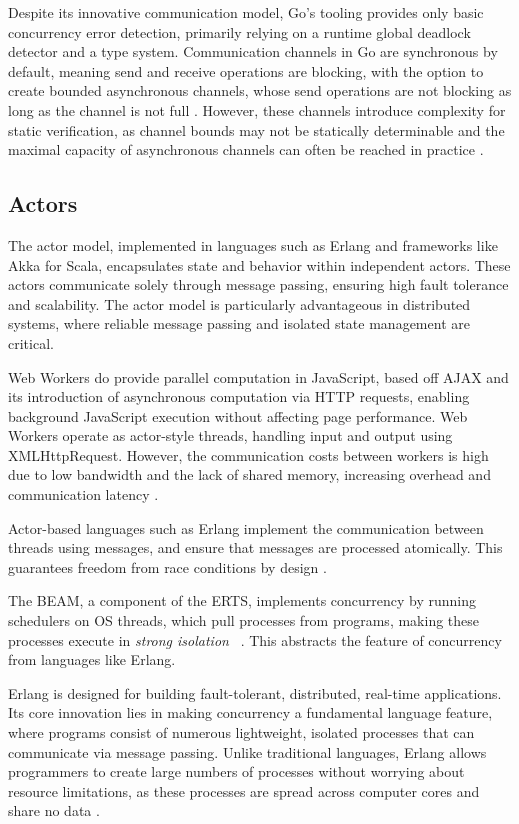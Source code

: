 \documentclass[]{final}
\begin{document}
Despite its innovative communication model, Go's tooling provides only basic
concurrency error detection, primarily relying on a runtime global deadlock
detector and a type system. Communication channels
in Go are synchronous by default, meaning send and receive operations are
blocking, with the option to create bounded asynchronous channels, whose
send operations are not blocking as long as the channel
is not full \cite{lange_empirical_2019}. However, these channels
introduce complexity for static verification, as channel bounds may not be
statically determinable and the maximal capacity of
asynchronous channels can often be reached in practice \cite{lange_empirical_2019}.

\subsection{Actors}
The actor model, implemented in languages such as Erlang and frameworks
like Akka for Scala, encapsulates state and behavior within independent actors.
These actors communicate solely through message passing, ensuring high fault
tolerance and scalability. The actor model is particularly advantageous in
distributed systems, where reliable message passing and isolated state
management are critical.

Web Workers do provide parallel computation in JavaScript, based off AJAX and its
introduction of asynchronous computation via HTTP requests, enabling background
JavaScript execution without affecting page performance. Web Workers operate as
actor-style threads, handling input and output using
XMLHttpRequest. However, the communication costs between workers
is high due to low bandwidth and the lack of shared memory,
increasing overhead and communication latency \cite{namiot_js_2015}.

Actor-based languages such as Erlang
implement the communication between threads
using messages, and ensure that messages are processed
atomically. This guarantees freedom from race conditions
by design \cite{bianchi_survey_2018}.

The BEAM, a component of the ERTS, implements concurrency by running schedulers
on OS threads, which pull processes from programs, making these processes execute in
\textit{strong isolation} ~\cite{stenman_erlang_2024, armstrong_making_2003, debenedetto_elixir_2019}.
This abstracts the feature of concurrency from languages like Erlang.

Erlang is designed for building fault-tolerant, distributed, real-time
applications. Its core innovation lies in making concurrency a fundamental
language feature, where programs consist of numerous lightweight,
isolated processes that can communicate via message passing.
Unlike traditional languages, Erlang allows programmers to
create large numbers of processes without worrying about resource limitations,
as these processes are spread across computer cores and share no data \cite{armstrong_erlang_2010}.
\end{document}
